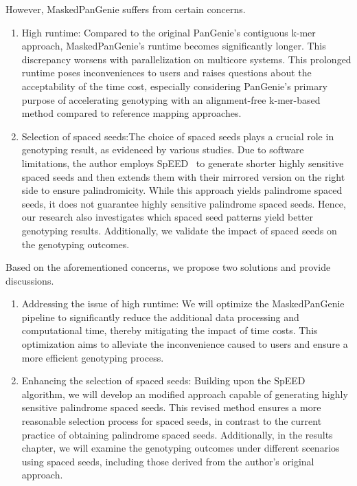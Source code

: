 \documentclass{PHlab-thesis}
\begin{document}
However, MaskedPanGenie suffers from certain concerns.
\begin{enumerate}[label=(\roman*)]
    \item High runtime: Compared to the original PanGenie's contiguous k-mer approach, MaskedPanGenie's runtime becomes significantly longer. This discrepancy worsens with parallelization on multicore systems. This prolonged runtime poses inconveniences to users and raises questions about the acceptability of the time cost, especially considering PanGenie's primary purpose of accelerating genotyping with an alignment-free k-mer-based method compared to reference mapping approaches.
    \item Selection of spaced seeds:The choice of spaced seeds plays a crucial role in genotyping result, as evidenced by various studies. Due to software limitations, the author employs SpEED~\cite{Lucian2011SpEED} to generate shorter highly sensitive spaced seeds and then extends them with their mirrored version on the right side to ensure palindromicity. While this approach yields palindrome spaced seeds, it does not guarantee highly sensitive palindrome spaced seeds. Hence, our research also investigates which spaced seed patterns yield better genotyping results. Additionally, we validate the impact of spaced seeds on the genotyping outcomes.
\end{enumerate}
Based on the aforementioned concerns, we propose two solutions and provide discussions.
\begin{enumerate}[label=(\roman*)]
    \item Addressing the issue of high runtime: We will optimize the MaskedPanGenie pipeline to significantly reduce the additional data processing and computational time, thereby mitigating the impact of time costs. This optimization aims to alleviate the inconvenience caused to users and ensure a more efficient genotyping process.
    \item Enhancing the selection of spaced seeds: Building upon the SpEED algorithm, we will develop an modified approach capable of generating highly sensitive palindrome spaced seeds. This revised method ensures a more reasonable selection process for spaced seeds, in contrast to the current practice of obtaining palindrome spaced seeds. Additionally, in the results chapter, we will examine the genotyping outcomes under different scenarios using spaced seeds, including those derived from the author's original approach.
\end{enumerate}
\end{document}
